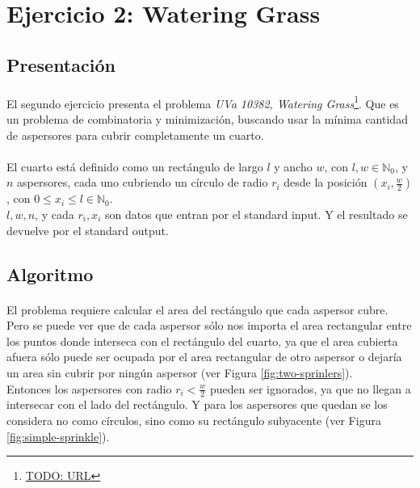 \documentclass[./main.tex]{subfiles}
\begin{document}
\section{Ejercicio 2: Watering Grass}
\label{sec:ej2}

\subsection{Presentación}
\label{sec:ej2-intro}

\paragraph{} El segundo ejercicio presenta el problema \textit{UVa 10382, Watering Grass}\footnote{\url{TODO: URL}}. Que es un problema de combinatoria y minimización, buscando usar la mínima cantidad de aspersores para cubrir completamente un cuarto.

\paragraph{} El cuarto está definido como un rectángulo de largo \(l\) y ancho \(w\), con \(l, w \in \mathbb{N}_0\), y \(n\) aspersores, cada uno cubriendo un círculo de radio \(r_i\) desde la posición \((x_i, \frac{w}{2})\), con \(0 \leq x_i \leq l \in \mathbb{N}_0\). \\
\(l, w, n\), y cada \(r_i, x_i\) son datos que entran por el standard input. Y el resultado se devuelve por el standard output.

\subsection{Algoritmo}
\label{sec:ej2-algo}

\paragraph{} El problema requiere calcular el area del rectángulo que cada aspersor cubre. Pero se puede ver que de cada aspersor sólo nos importa el area rectangular entre los puntos donde interseca con el rectángulo del cuarto, ya que el area cubierta afuera sólo puede ser ocupada por el area rectangular de otro aspersor o dejaría un area sin cubrir por ningún aspersor (ver Figura \ref{fig:two-sprinlers}). \\
\indent Entonces los aspersores con radio \(r_i < \frac{w}{2}\) pueden ser ignorados, ya que no llegan a intersecar con el lado del rectángulo. Y para los aspersores que quedan se los considera no como círculos, sino como su rectángulo subyacente (ver Figura \ref{fig:simple-sprinkle}).
\end{document}
